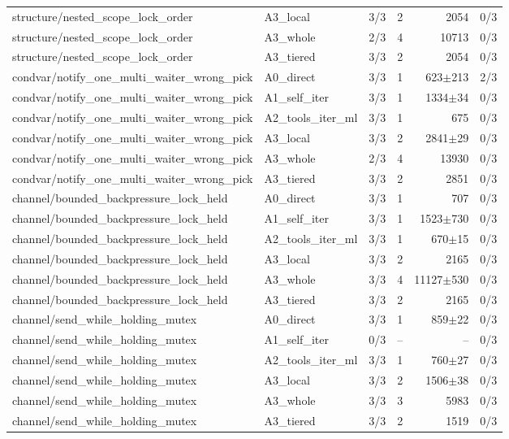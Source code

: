 \begin{tabular}{llrrrr}
structure/nested\_scope\_lock\_order & A3\_local & 3/3 & 2 & 2054 & 0/3 \\
structure/nested\_scope\_lock\_order & A3\_whole & 2/3 & 4 & 10713 & 0/3 \\
structure/nested\_scope\_lock\_order & A3\_tiered & 3/3 & 2 & 2054 & 0/3 \\
condvar/notify\_one\_multi\_waiter\_wrong\_pick & A0\_direct & 3/3 & 1 & 623$\pm$213 & 2/3 \\
condvar/notify\_one\_multi\_waiter\_wrong\_pick & A1\_self\_iter & 3/3 & 1 & 1334$\pm$34 & 0/3 \\
condvar/notify\_one\_multi\_waiter\_wrong\_pick & A2\_tools\_iter\_ml & 3/3 & 1 & 675 & 0/3 \\
condvar/notify\_one\_multi\_waiter\_wrong\_pick & A3\_local & 3/3 & 2 & 2841$\pm$29 & 0/3 \\
condvar/notify\_one\_multi\_waiter\_wrong\_pick & A3\_whole & 2/3 & 4 & 13930 & 0/3 \\
condvar/notify\_one\_multi\_waiter\_wrong\_pick & A3\_tiered & 3/3 & 2 & 2851 & 0/3 \\
channel/bounded\_backpressure\_lock\_held & A0\_direct & 3/3 & 1 & 707 & 0/3 \\
channel/bounded\_backpressure\_lock\_held & A1\_self\_iter & 3/3 & 1 & 1523$\pm$730 & 0/3 \\
channel/bounded\_backpressure\_lock\_held & A2\_tools\_iter\_ml & 3/3 & 1 & 670$\pm$15 & 0/3 \\
channel/bounded\_backpressure\_lock\_held & A3\_local & 3/3 & 2 & 2165 & 0/3 \\
channel/bounded\_backpressure\_lock\_held & A3\_whole & 3/3 & 4 & 11127$\pm$530 & 0/3 \\
channel/bounded\_backpressure\_lock\_held & A3\_tiered & 3/3 & 2 & 2165 & 0/3 \\
channel/send\_while\_holding\_mutex & A0\_direct & 3/3 & 1 & 859$\pm$22 & 0/3 \\
channel/send\_while\_holding\_mutex & A1\_self\_iter & 0/3 & -- & -- & 0/3 \\
channel/send\_while\_holding\_mutex & A2\_tools\_iter\_ml & 3/3 & 1 & 760$\pm$27 & 0/3 \\
channel/send\_while\_holding\_mutex & A3\_local & 3/3 & 2 & 1506$\pm$38 & 0/3 \\
channel/send\_while\_holding\_mutex & A3\_whole & 3/3 & 3 & 5983 & 0/3 \\
channel/send\_while\_holding\_mutex & A3\_tiered & 3/3 & 2 & 1519 & 0/3 \\

\end{tabular}
